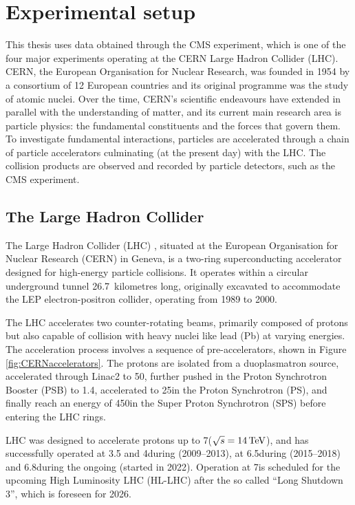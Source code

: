 \chapter{Experimental setup}
This thesis uses data obtained through the CMS experiment, which is one of the four major experiments operating at the CERN Large Hadron Collider (LHC).
CERN, the European Organisation for Nuclear Research, was founded in 1954 by a consortium of 12 European countries and its original programme was the study of atomic nuclei.
Over the time, CERN's scientific endeavours have extended in parallel with the understanding of matter, and its current main research area is particle physics: the fundamental constituents and the forces that govern them.
To investigate fundamental interactions, particles are accelerated through a chain of particle accelerators culminating (at the present day) with the LHC.
The collision products are observed and recorded by particle detectors, such as the CMS experiment.

\section{The Large Hadron Collider}
The Large Hadron Collider (LHC) \cite{CERN-AC-93-03-LHC}, situated at the European Organisation for Nuclear Research (CERN) in Geneva, is a two-ring superconducting accelerator designed for high-energy particle collisions.
It operates within a circular underground tunnel 26.7~kilometres long, originally excavated to accommodate the LEP electron-positron collider, operating from 1989 to 2000.

The LHC accelerates two counter-rotating beams, primarily composed of protons but also capable of collision with heavy nuclei like lead (Pb) at varying energies.
The acceleration process involves a sequence of pre-accelerators, shown in Figure \ref{fig:CERNaccelerators}.
The protons are isolated from a duoplasmatron source, accelerated through Linac2 to 50\MeV, further pushed in the Proton Synchrotron Booster (PSB) to 1.4\GeV, accelerated to 25\GeV in the Proton Synchrotron (PS), and finally reach an energy of 450\GeV in the Super Proton Synchrotron (SPS) before entering the LHC rings.

LHC was designed to accelerate protons up to 7\TeV ($\sqrt{s} = 14\,\text{Te\hspace{-.08em}V}$),
and has successfully operated at 3.5 and 4\TeV during  (2009--2013),
at 6.5\TeV during  (2015--2018) and 6.8\TeV during the ongoing  (started in 2022).
Operation at 7\TeV is scheduled for the upcoming High Luminosity LHC (HL-LHC) after the so called ``Long Shutdown 3'', which is foreseen for 2026.

